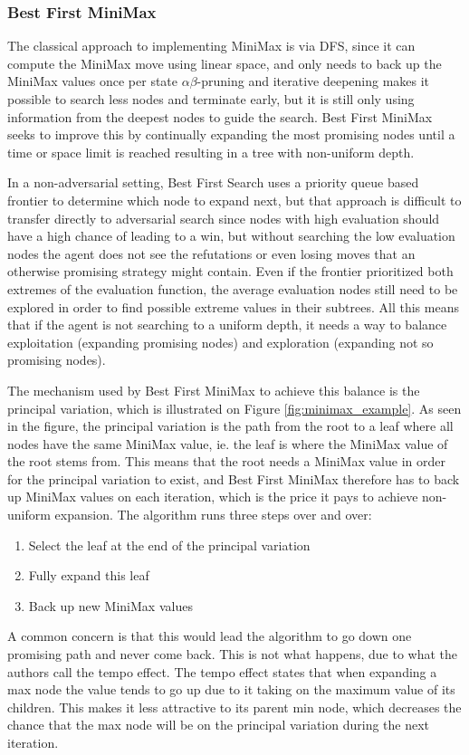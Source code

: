 

\subsubsection{Best First MiniMax}
The classical approach to implementing MiniMax is via DFS, since it can compute the MiniMax move using linear space, and only needs to back up the MiniMax values once per state $\alpha\beta$-pruning and iterative deepening makes it possible to search less nodes and terminate early, but it is still only using information from the deepest nodes to guide the search. Best First MiniMax seeks to improve this by continually expanding the most promising nodes until a time or space limit is reached resulting in a tree with non-uniform depth.

In a non-adversarial setting, Best First Search uses a priority queue based frontier to determine which node to expand next, but that approach is difficult to transfer directly to adversarial search since nodes with high evaluation should have a high chance of leading to a win, but without searching the low evaluation nodes the agent does not see the refutations or even losing moves that an otherwise promising strategy might contain. Even if the frontier prioritized both extremes of the evaluation function, the average evaluation nodes still need to be explored in order to find possible extreme values in their subtrees. All this means that if the agent is not searching to a uniform depth, it needs a way to balance exploitation (expanding promising nodes) and exploration (expanding not so promising nodes).

The mechanism used by Best First MiniMax \cite{Korf1996} to achieve this balance is the principal variation, which is illustrated on Figure \ref{fig:minimax_example}. As seen in the figure, the principal variation is the path from the root to a leaf where all nodes have the same MiniMax value, ie. the leaf is  where the MiniMax value of the root stems from. This means that the root needs a MiniMax value in order for the principal variation to exist, and Best First MiniMax therefore has to back up MiniMax values on each iteration, which is the price it pays to achieve non-uniform expansion. The algorithm runs three steps over and over:
\begin{enumerate}
    \item Select the leaf at the end of the principal variation
    \item Fully expand this leaf
    \item Back up new MiniMax values 
\end{enumerate}
A common concern is that this would lead the algorithm to go down one promising path and never come back. This is not what happens, due to what the authors call the tempo effect. The tempo effect states that when expanding a max node the value tends to go up due to it taking on the maximum value of its children. This makes it less attractive to its parent min node, which decreases the chance that the max node will be on the principal variation during the next iteration.

